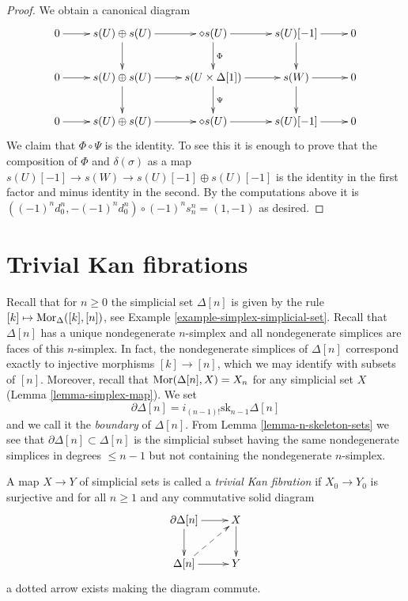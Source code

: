 \begin{proof}
\medskip\noindent
We obtain a canonical diagram
$$
\xymatrix{
0 \ar[r] &
s(U) \oplus s(U) \ar[r] \ar[d] &
\diamond{s(U)} \ar[r] \ar[d]^{\Phi}&
s(U)[-1] \ar[r] \ar[d] &
0 \\
0 \ar[r] &
s(U) \oplus s(U) \ar[r] \ar[d] &
s(U \times \Delta[1]) \ar[r] \ar[d]^\Psi &
s(W) \ar[r] \ar[d] &
0 \\
0 \ar[r] &
s(U) \oplus s(U) \ar[r] &
\diamond{s(U)} \ar[r] &
s(U)[-1] \ar[r] &
0
}
$$
We claim that $\Phi \circ \Psi$ is the identity.
To see this it is enough to prove that the composition
of $\Phi$ and $\delta(\sigma)$ as a map
$s(U)[-1] \to s(W) \to s(U)[-1] \oplus s(U)[-1]$ is the
identity in the first factor and minus identity in the second.
By the computations above it is
$((-1)^nd^n_0, -(-1)^nd^n_0) \circ (-1)^n s^n_n = (1, -1)$
as desired.
\end{proof}









\section{Trivial Kan fibrations}
\label{section-trivial-kan}

\noindent
Recall that for $n \geq 0$ the simplicial set $\Delta[n]$ is given
by the rule $[k] \mapsto \mathop{\mathrm{Mor}}\nolimits_\Delta([k], [n])$, see
Example \ref{example-simplex-simplicial-set}. Recall that $\Delta[n]$
has a unique nondegenerate $n$-simplex and all nondegenerate simplices
are faces of this $n$-simplex. In fact, the nondegenerate simplices of
$\Delta[n]$ correspond exactly to injective morphisms $[k] \to [n]$,
which we may identify with subsets of $[n]$. Moreover, recall that
$\mathop{\mathrm{Mor}}\nolimits(\Delta[n], X) = X_n$ for any simplicial set $X$
(Lemma \ref{lemma-simplex-map}).
We set
$$
\partial \Delta[n] = i_{(n - 1)!}\text{sk}_{n - 1}\Delta[n]
$$
and we call it the {\it boundary} of $\Delta[n]$.
From Lemma \ref{lemma-n-skeleton-sets} we see that
$\partial \Delta[n] \subset \Delta[n]$
is the simplicial subset having the same nondegenerate simplices
in degrees $\leq n - 1$ but not containing the nondegenerate $n$-simplex.

\begin{definition}
\label{definition-trivial-kan}
A map $X \to Y$ of simplicial sets is called a {\it trivial Kan fibration}
if $X_0 \to Y_0$ is surjective and for all $n \geq 1$ and any commutative
solid diagram
$$
\xymatrix{
\partial \Delta[n] \ar[r] \ar[d] & X \ar[d] \\
\Delta[n] \ar[r] \ar@{-->}[ru] & Y
}
$$
a dotted arrow exists making the diagram commute.
\end{definition}

